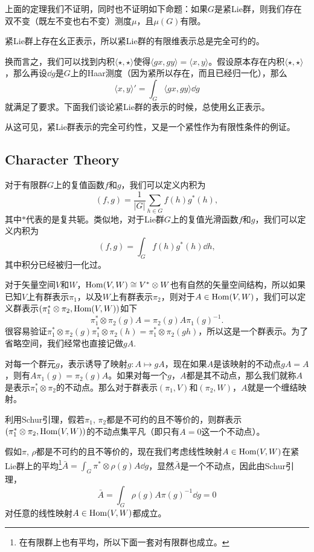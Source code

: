 \documentclass[9pt]{extarticle}
\begin{document}
上面的定理我们不证明，同时也不证明如下命题：如果$G$是紧Lie群，则我们存在双不变（既左不变也右不变）测度$\mu$，且$\mu(G)$有限。

\para 紧Lie群上存在幺正表示，所以紧Lie群的有限维表示总是完全可约的。 

换而言之，我们可以找到内积$\langle \star,\star\rangle$使得$\langle gx,gy\rangle=\langle x,y\rangle$。假设原本存在内积$\langle \star,\star \rangle$，那么再设$\dd g$是$G$上的Haar测度（因为紧所以存在，而且已经归一化），那么
\[
	\langle x,y\rangle'=\int_G \langle gx,gy \rangle \dd g
\]
就满足了要求。下面我们谈论紧Lie群的表示的时候，总使用幺正表示。

从这可见，紧Lie群表示的完全可约性，又是一个紧性作为有限性条件的例证。

\subsection*{Character Theory}

\para 对于有限群$G$上的复值函数$f$和$g$，我们可以定义内积为
\[
	(f,g)=\frac{1}{|G|}\sum_{h\in G} f(h)g^*(h),
\]
其中$*$代表的是复共轭。类似地，对于Lie群$G$上的复值光滑函数$f$和$g$，我们可以定义内积为
\[
	(f,g)=\int_G f(h)g^*(h)\dd h,
\]
其中积分已经被归一化过。

\para 对于矢量空间$V$和$W$，$\operatorname{Hom}(V,W)\cong V^*\otimes W$也有自然的矢量空间结构，所以如果已知$V$上有群表示$\pi_1$，以及$W$上有群表示$\pi_2$，则对于$A\in \operatorname{Hom}(V,W)$，我们可以定义群表示$(\pi_1^*\otimes\pi_2,\operatorname{Hom}(V,W))$如下
\[
	\pi_1^*\otimes\pi_2(g)A=\pi_2(g)A\pi_1(g)^{-1}.
\]
很容易验证$\pi_1^*\otimes\pi_2(g)\pi_1^*\otimes\pi_2(h)=\pi_1^*\otimes\pi_2(gh)$，所以这是一个群表示。为了省略空间，我们经常也直接记做$gA$.

对每一个群元$g$，表示诱导了映射$g:A\mapsto gA$，现在如果$A$是该映射的不动点$gA=A$，则有$A\pi_1(g)=\pi_2(g)A$。如果对每一个$g$，$A$都是其不动点，那么我们就称$A$是表示$\pi_1^*\otimes\pi_2$的不动点。那么对于群表示$(\pi_1,V)$和$(\pi_2,W)$，$A$就是一个缠结映射。

\para 利用Schur引理，假若$\pi_1$, $\pi_2$都是不可约的且不等价的，则群表示$(\pi_1^*\otimes\pi_2,\operatorname{Hom}(V,W))$的不动点集平凡（即只有$A=0$这一个不动点）。

假如$\pi$, $\rho$都是不可约的且不等价的，现在我们考虑线性映射$A\in \operatorname{Hom}(V,W)$在紧Lie群上的平均\footnote{在有限群上也有平均，所以下面一套对有限群也成立。}$\bar{A}=\int_G \pi^*\otimes\rho(g)A \dd g$，显然$\bar{A}$是一个不动点，因此由Schur引理，
\[
	\bar{A}=\int_G \rho(g)A\pi(g)^{-1}\dd g=0
\]
对任意的线性映射$A\in \operatorname{Hom}(V,W)$都成立。
\end{document}
